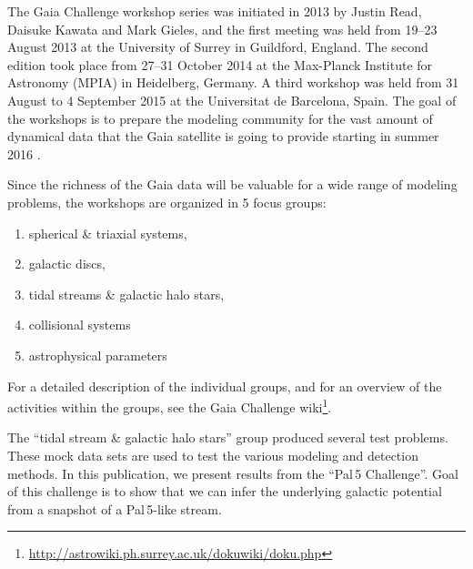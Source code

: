 The Gaia Challenge workshop series was initiated in 2013 by Justin Read, Daisuke Kawata and Mark Gieles, and the first meeting was held from 19--23 August 2013 at the University of Surrey in Guildford, England. 
The second edition took place from 27--31 October 2014 at the Max-Planck Institute for Astronomy (MPIA) in Heidelberg, Germany. 
A third workshop was held from 31 August to 4 September 2015 at the Universitat de Barcelona, Spain.
The goal of the workshops is to prepare the modeling community for the vast amount of dynamical data that the Gaia satellite is going to provide starting in summer 2016 \citep{Perryman01}.

Since the richness of the Gaia data will be valuable for a wide range of modeling problems, the workshops are organized in 5 focus groups:
\begin{enumerate}
\item spherical \& triaxial systems,
\item galactic discs,
\item tidal streams \& galactic halo stars,
\item collisional systems
\item astrophysical parameters 
\end{enumerate}
For a detailed description of the individual groups, and for an overview of the activities within the groups, see the Gaia Challenge wiki\footnote{\url{http://astrowiki.ph.surrey.ac.uk/dokuwiki/doku.php}}.

The ``tidal stream \& galactic halo stars'' group produced several test problems. These mock data sets are used to test the various modeling and detection methods. In this publication, we present results from the ``Pal\,5 Challenge''. Goal of this challenge is to show that we can infer the underlying galactic potential from a snapshot of a Pal\,5-like stream.